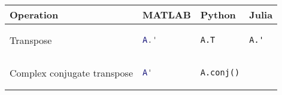 \documentclass[]{article}
\begin{document}
\begin{longtable}[]{@{}llll@{}}
\toprule
\begin{minipage}[b]{0.24\columnwidth}\raggedright\strut
Operation\strut
\end{minipage} & \begin{minipage}[b]{0.23\columnwidth}\raggedright\strut
MATLAB\strut
\end{minipage} & \begin{minipage}[b]{0.20\columnwidth}\raggedright\strut
Python\strut
\end{minipage} & \begin{minipage}[b]{0.20\columnwidth}\raggedright\strut
Julia\strut
\end{minipage}\tabularnewline
\midrule
\endhead
\begin{minipage}[t]{0.24\columnwidth}\raggedright\strut
Transpose\strut
\end{minipage} & \begin{minipage}[t]{0.23\columnwidth}\raggedright\strut
\begin{lstlisting}[language=Matlab]
A.'
\end{lstlisting}
\strut
\end{minipage} & \begin{minipage}[t]{0.20\columnwidth}\raggedright\strut
\begin{lstlisting}[language=Python]
A.T
\end{lstlisting}
\strut
\end{minipage} & \begin{minipage}[t]{0.20\columnwidth}\raggedright\strut
\begin{lstlisting}
A.'
\end{lstlisting}
\strut
\end{minipage}\tabularnewline
\begin{minipage}[t]{0.24\columnwidth}\raggedright\strut
Complex conjugate transpose\strut
\end{minipage} & \begin{minipage}[t]{0.23\columnwidth}\raggedright\strut
\begin{lstlisting}[language=Matlab]
A'
\end{lstlisting}
\strut
\end{minipage} & \begin{minipage}[t]{0.20\columnwidth}\raggedright\strut
\begin{lstlisting}[language=Python]
A.conj()
\end{lstlisting}
\strut
\end{minipage} & \begin{minipage}[t]{0.20\columnwidth}\raggedright\strut

\end{minipage}
\end{longtable}
\end{document}
